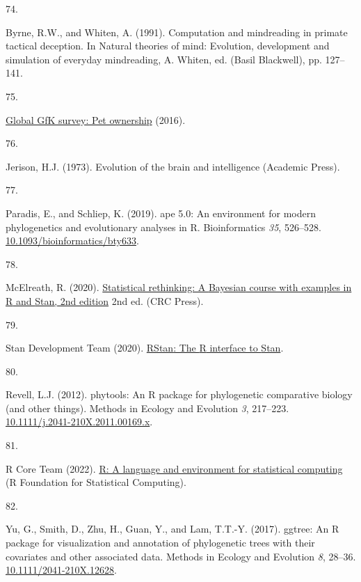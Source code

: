 \documentclass[
  man, donotrepeattitle,floatsintext]{apa6}
\newlength{\cslhangindent}
\newlength{\csllabelwidth}
\newlength{\cslentryspacingunit} %
\newenvironment{CSLReferences}[2] %
 {%
  \setlength{\parindent}{0pt}
  \ifodd #1
  \let\oldpar\par
  \def\par{\hangindent=\cslhangindent\oldpar}
  \fi
  \setlength{\parskip}{#2\cslentryspacingunit}
 }%
 {}
\newcommand{\CSLLeftMargin}[1]{\parbox[t]{\csllabelwidth}{#1}}
\newcommand{\CSLRightInline}[1]{\parbox[t]{\linewidth - \csllabelwidth}{#1}\break}
\begin{document}
\begin{CSLReferences}{0}{0}
\leavevmode{}%
\CSLLeftMargin{74. }%
\CSLRightInline{Byrne, R.W., and Whiten, A. (1991). Computation and mindreading in primate tactical deception. In Natural theories of mind: Evolution, development and simulation of everyday mindreading, A. Whiten, ed. (Basil Blackwell), pp. 127--141.}

\leavevmode{}%
\CSLLeftMargin{75. }%
\CSLRightInline{\href{http://www.gfk.com/global-studies/global-studies-pet-ownership}{Global GfK survey: Pet ownership} (2016).}

\leavevmode{}%
\CSLLeftMargin{76. }%
\CSLRightInline{Jerison, H.J. (1973). Evolution of the brain and intelligence (Academic Press).}

\leavevmode{}%
\CSLLeftMargin{77. }%
\CSLRightInline{Paradis, E., and Schliep, K. (2019). {ape} 5.0: An environment for modern phylogenetics and evolutionary analyses in {R}. Bioinformatics \emph{35}, 526--528. \href{https://doi.org/10.1093/bioinformatics/bty633}{10.1093/bioinformatics/bty633}.}

\leavevmode{}%
\CSLLeftMargin{78. }%
\CSLRightInline{McElreath, R. (2020). \href{http://xcelab.net/rm/statistical-rethinking/}{Statistical rethinking: A {Bayesian} course with examples in {R} and {Stan}, 2nd edition} 2nd ed. (CRC Press).}

\leavevmode{}%
\CSLLeftMargin{79. }%
\CSLRightInline{Stan Development Team (2020). \href{http://mc-stan.org/}{{RStan}: The {R} interface to {Stan}}.}

\leavevmode{}%
\CSLLeftMargin{80. }%
\CSLRightInline{Revell, L.J. (2012). {phytools}: An {R} package for phylogenetic comparative biology (and other things). Methods in Ecology and Evolution \emph{3}, 217--223. \href{https://doi.org/10.1111/j.2041-210X.2011.00169.x}{10.1111/j.2041-210X.2011.00169.x}.}

\leavevmode{}%
\CSLLeftMargin{81. }%
\CSLRightInline{R Core Team (2022). \href{https://www.R-project.org/}{R: A language and environment for statistical computing} (R Foundation for Statistical Computing).}

\leavevmode{}%
\CSLLeftMargin{82. }%
\CSLRightInline{Yu, G., Smith, D., Zhu, H., Guan, Y., and Lam, T.T.-Y. (2017). {ggtree}: An {R} package for visualization and annotation of phylogenetic trees with their covariates and other associated data. Methods in Ecology and Evolution \emph{8}, 28--36. \href{https://doi.org/10.1111/2041-210X.12628}{10.1111/2041-210X.12628}.}


\end{CSLReferences}
\end{document}
